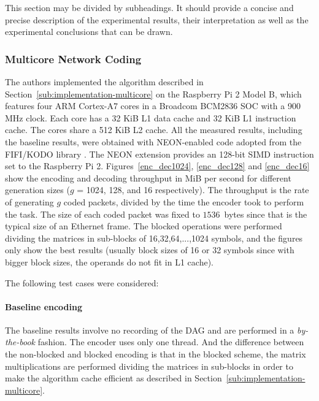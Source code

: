 \label{sec:measurements}

This section may be divided by subheadings. It should provide a concise and
precise description of the experimental results, their interpretation as well as
the experimental conclusions that can be drawn.

\subsubsection{Multicore Network Coding}
\label{subs:multicore-network-coding}

The authors implemented the algorithm described in
Section~\ref{sub:implementation-multicore} on the Raspberry Pi 2 Model B, which
features four ARM Cortex-A7 cores in a Broadcom BCM2836 \ac{SOC} with a 900 MHz
clock. Each core has a 32 KiB L1 data cache and 32 KiB L1 instruction cache. The
cores share a 512 KiB L2 cache. All the measured results, including the baseline
results, were obtained with NEON-enabled code adopted from the FIFI/KODO library
\cite{kodo2011pedersen}. The NEON extension provides an 128-bit \ac{SIMD}
instruction set to the Raspberry Pi 2. Figures~\ref{enc_dec1024},
\ref{enc_dec128} and \ref{enc_dec16} show the encoding and decoding throughput
in MiB per second for different generation sizes ($g$ = 1024, 128, and 16
respectively). The throughput is the rate of generating $g$ coded packets,
divided by the time the encoder took to perform the task. The size of each coded
packet was fixed to $1536$~bytes since that is the typical size of an Ethernet
frame. The blocked operations were performed dividing the matrices in sub-blocks
of 16,32,64,...,1024 symbols, and the figures only show the best results
(usually block sizes of 16 or 32 symbols since with bigger block sizes, the
operands do not fit in L1 cache).

The following test cases were considered:

\paragraph{Baseline encoding} The baseline results involve no recording
of the \ac{DAG} and are performed in a \emph{by-the-book} fashion. The encoder
uses only one thread. And the difference between the non-blocked and blocked
encoding is that in the blocked scheme, the matrix multiplications are performed
dividing the matrices in sub-blocks in order to make the algorithm cache
efficient as described in Section~\ref{sub:implementation-multicore}.

